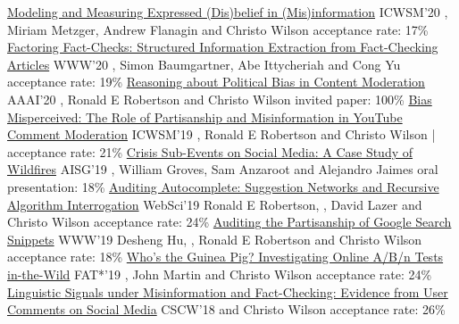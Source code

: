 \documentclass[letterpaper]{awesome-cv}
\begin{document}
\addvspace{0ex}
\begin{cventries}
  \cvpub
    {\href{https://shanjiang.me/publications/icwsm20_paper.pdf}{Modeling and Measuring Expressed (Dis)belief in (Mis)information}}
    {ICWSM'20}
    {, Miriam Metzger, Andrew Flanagin and Christo Wilson}
    {acceptance rate: 17\%}
  \cvpub
    {\href{https://shanjiang.me/publications/www20_paper.pdf}{Factoring Fact-Checks: Structured Information Extraction from Fact-Checking Articles}}
    {WWW'20}
    {, Simon Baumgartner, Abe Ittycheriah and Cong Yu}
    {acceptance rate: 19\%}
  \cvpub
    {\href{https://shanjiang.me/publications/aaai20_paper.pdf}{Reasoning about Political Bias in Content Moderation}}
    {AAAI'20}
    {, Ronald E Robertson and Christo Wilson}
    {invited paper: 100\%}
  \cvpubspecial
    {\href{https://shanjiang.me/publications/icwsm19_paper.pdf}{Bias Misperceived: The Role of Partisanship and Misinformation in YouTube Comment Moderation}}
    {ICWSM'19}
    {, Ronald E Robertson and Christo Wilson}
    {  | acceptance rate: 21\%}
  \cvpub
    {\href{https://shanjiang.me/publications/aisg19_paper.pdf}{Crisis Sub-Events on Social Media: A Case Study of Wildfires}}
    {AISG'19}
    {, William Groves, Sam Anzaroot and Alejandro Jaimes}
    {oral presentation: 18\%}
  \cvpub
    {\href{https://shanjiang.me/publications/websci19_paper.pdf}{Auditing Autocomplete: Suggestion Networks and Recursive Algorithm Interrogation}}
    {WebSci'19}
    {Ronald E Robertson, , David Lazer and Christo Wilson}
    {acceptance rate: 24\%}
  \cvpub
    {\href{https://shanjiang.me/publications/www19_paper.pdf}{Auditing the Partisanship of Google Search Snippets}}
    {WWW'19}
    {Desheng Hu, , Ronald E Robertson and Christo Wilson}
    {acceptance rate: 18\%}
  \cvpub
    {\href{https://shanjiang.me/publications/fat19_paper.pdf}{Who's the Guinea Pig? Investigating Online A/B/n Tests in-the-Wild}}
    {FAT*'19}
    {, John Martin and Christo Wilson}
    {acceptance rate: 24\%}
  \cvpub
    {\href{https://shanjiang.me/publications/cscw18a_paper.pdf}{Linguistic Signals under Misinformation and Fact-Checking: Evidence from User Comments on Social Media}}
    {CSCW'18}
    { and Christo Wilson}
    {acceptance rate: 26\%}

\end{cventries}
\end{document}
